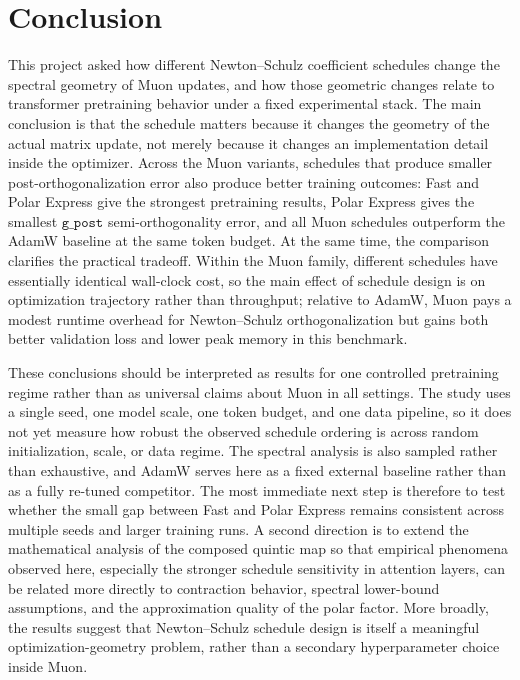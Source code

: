 \documentclass[10pt]{article}
\begin{document}
\FloatBarrier

\section{Conclusion}
This project asked how different Newton--Schulz coefficient schedules change the spectral geometry of Muon updates, and how those geometric changes relate to transformer pretraining behavior under a fixed experimental stack. The main conclusion is that the schedule matters because it changes the geometry of the actual matrix update, not merely because it changes an implementation detail inside the optimizer. Across the Muon variants, schedules that produce smaller post-orthogonalization error also produce better training outcomes: Fast and Polar Express give the strongest pretraining results, Polar Express gives the smallest $\texttt{g\_post}$ semi-orthogonality error, and all Muon schedules outperform the AdamW baseline at the same token budget. At the same time, the comparison clarifies the practical tradeoff. Within the Muon family, different schedules have essentially identical wall-clock cost, so the main effect of schedule design is on optimization trajectory rather than throughput; relative to AdamW, Muon pays a modest runtime overhead for Newton--Schulz orthogonalization but gains both better validation loss and lower peak memory in this benchmark.

These conclusions should be interpreted as results for one controlled pretraining regime rather than as universal claims about Muon in all settings. The study uses a single seed, one model scale, one token budget, and one data pipeline, so it does not yet measure how robust the observed schedule ordering is across random initialization, scale, or data regime. The spectral analysis is also sampled rather than exhaustive, and AdamW serves here as a fixed external baseline rather than as a fully re-tuned competitor. The most immediate next step is therefore to test whether the small gap between Fast and Polar Express remains consistent across multiple seeds and larger training runs. A second direction is to extend the mathematical analysis of the composed quintic map so that empirical phenomena observed here, especially the stronger schedule sensitivity in attention layers, can be related more directly to contraction behavior, spectral lower-bound assumptions, and the approximation quality of the polar factor. More broadly, the results suggest that Newton--Schulz schedule design is itself a meaningful optimization-geometry problem, rather than a secondary hyperparameter choice inside Muon.

\begingroup
\footnotesize
\setlength{\bibsep}{1.5pt}


\endgroup
\end{document}
